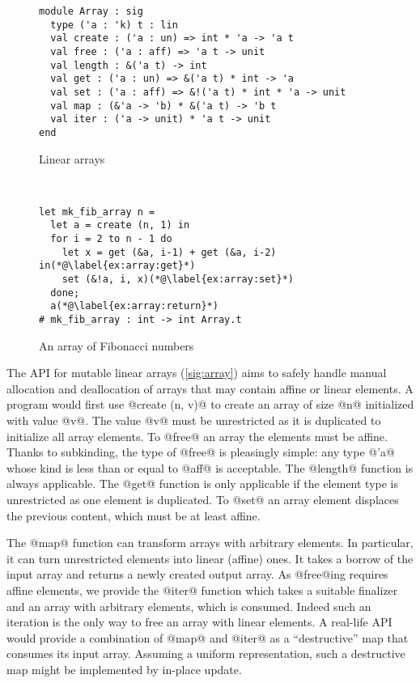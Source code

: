\begin{figure}[tp]
  \centering
  \begin{minipage}{0.5\linewidth}
\begin{lstlisting}
module Array : sig
  type ('a : 'k) t : lin
  val create : ('a : un) => int * 'a -> 'a t
  val free : ('a : aff) => 'a t -> unit
  val length : &('a t) -> int
  val get : ('a : un) => &('a t) * int -> 'a
  val set : ('a : aff) => &!('a t) * int * 'a -> unit
  val map : (&'a -> 'b) * &('a t) -> 'b t
  val iter : ('a -> unit) * 'a t -> unit
end
\end{lstlisting}
  \vspace{-15pt}
  \caption{Linear arrays}
  \label{ex:array}
  \label{sig:array}
  \vspace{-10pt}
\end{minipage}~
\begin{minipage}{0.5\linewidth}
\begin{lstlisting}
let mk_fib_array n =
  let a = create (n, 1) in
  for i = 2 to n - 1 do
    let x = get (&a, i-1) + get (&a, i-2) in(*@\label{ex:array:get}*)
    set (&!a, i, x)(*@\label{ex:array:set}*)
  done;
  a(*@\label{ex:array:return}*)
# mk_fib_array : int -> int Array.t
\end{lstlisting}
  \vspace{-5pt}
  \caption{An array of Fibonacci numbers}
  \label{ex:fibo}
  \vspace{-10pt}
\end{minipage}

\end{figure}

The API for mutable linear arrays (\cref{sig:array})
aims to safely handle manual allocation and
deallocation of arrays that may contain affine or linear elements.
A program would first use @create (n, v)@ to create
an array of size @n@ initialized with value
@v@. The value @v@ must be unrestricted as it is duplicated to
initialize all array elements.
To @free@ an array the elements must be affine. Thanks to subkinding,
the type of @free@ is pleasingly simple: any type @'a@ whose kind is
less than or equal to @aff@ is acceptable. 
The @length@ function is always applicable.
The @get@ function is only applicable
if the element type is unrestricted as one element is duplicated.
To @set@ an array element displaces the previous content, which must
be at least affine.

The @map@ function can transform arrays with arbitrary elements. In 
particular, it can turn unrestricted elements into linear (affine)
ones. It takes a borrow of the input array and returns a newly created
output array. As @free@ing requires affine elements, we provide the
@iter@ function which takes a
suitable finalizer and an array with arbitrary elements, which is
consumed. Indeed such an iteration is the only way to free an array
with linear elements. A real-life
API would provide a combination of @map@ and @iter@ as a
``destructive'' map that consumes its input array. Assuming a uniform
representation, such a destructive map might be implemented by
in-place update.

